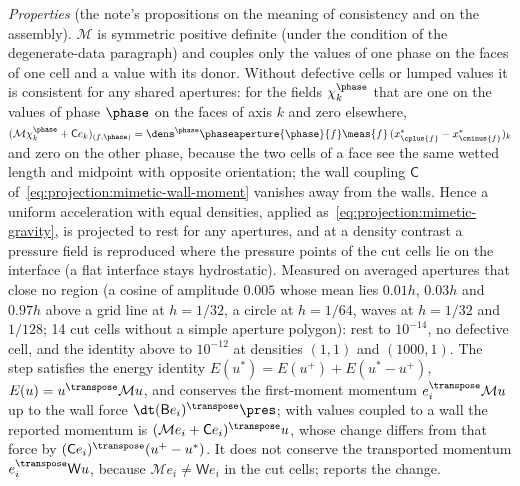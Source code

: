 \emph{Properties} (the note's propositions on the meaning of consistency
and on the assembly). $\mathcal M$ is symmetric positive definite (under the
condition of the degenerate-data paragraph) and couples only the
values of one phase on the faces of one cell and a value with its donor.
Without defective cells or lumped values it is consistent for any shared
apertures: for the fields $\chi^{\phase}_k$ that are one on the values of
phase $\phase$ on the faces of axis $k$ and zero elsewhere,
$(\mathcal M\chi^{\phase}_k+\mathsf Ce_k)_{(f,\phase)}=\dens^{\phase}\phaseaperture{\phase}{f}\meas{f}\,(x^{*}_{\cplus{f}}-x^{*}_{\cminus{f}})_k$
and zero on the other phase, because the two cells of a face see the same
wetted length and midpoint with opposite orientation; the wall coupling
$\mathsf C$ of~\cref{eq:projection:mimetic-wall-moment} vanishes away from
the walls. Hence a uniform acceleration with equal densities, applied
as~\cref{eq:projection:mimetic-gravity}, is projected to rest for any apertures,
and at a density contrast a pressure field is reproduced where the pressure
points of the cut cells lie on the interface (a flat interface stays
hydrostatic). Measured on averaged apertures that close no region (a cosine
of amplitude $0.005$ whose mean lies $0.01h$, $0.03h$ and $0.97h$ above a grid
line at $h=1/32$, a circle at $h=1/64$, waves at $h=1/32$ and $1/128$; 14 cut
cells without a simple aperture polygon): rest to $10^{-14}$, no defective
cell, and the identity above to $10^{-12}$ at densities $(1,1)$ and
$(1000,1)$. The step satisfies the energy identity
$E(u^{*})=E(u^{+})+E(u^{*}-u^{+})$, $E(u)=u^{\transpose}\mathcal Mu$, and
conserves the first-moment momentum $e_i^{\transpose}\mathcal Mu$ up to the
wall force $\dt(\mathsf Be_i)^{\transpose}\pres$; with values coupled to a
wall the reported momentum is $(\mathcal Me_i+\mathsf Ce_i)^{\transpose}u$,
whose change differs from that force by $(\mathsf Ce_i)^{\transpose}(u^{+}-u^{*})$. It does not conserve the
transported momentum $e_i^{\transpose}\mathsf Wu$, because $\mathcal Me_i\ne\mathsf We_i$
in the cut cells;  reports the change.

